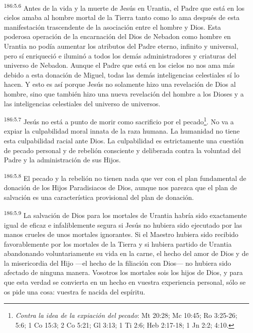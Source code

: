 \par 
\textsuperscript{186:5.6} Antes de la vida y la muerte de Jesús en Urantia, el Padre que está en los cielos amaba al hombre mortal de la Tierra tanto como lo ama después de esta manifestación trascendente de la asociación entre el hombre y Dios. Esta poderosa operación de la encarnación del Dios de Nebadon como hombre en Urantia no podía aumentar los atributos del Padre eterno, infinito y universal, pero sí enriqueció e iluminó a todos los demás administradores y criaturas del universo de Nebadon. Aunque el Padre que está en los cielos no nos ama más debido a esta donación de Miguel, todas las demás inteligencias celestiales sí lo hacen. Y esto es así porque Jesús no solamente hizo una revelación de Dios al hombre, sino que también hizo una nueva revelación del hombre a los Dioses y a las inteligencias celestiales del universo de universos.

\par 
\textsuperscript{186:5.7} Jesús no está a punto de morir como sacrificio por el pecado\footnote{\textit{Contra la idea de la expiación del pecado}: Mt 20:28; Mc 10:45; Ro 3:25-26; 5:6; 1 Co 15:3; 2 Co 5:21; Gl 3:13; 1 Ti 2:6; Heb 2:17-18; 1 Jn 2:2; 4:10.}. No va a expiar la culpabilidad moral innata de la raza humana. La humanidad no tiene esta culpabilidad racial ante Dios. La culpabilidad es estrictamente una cuestión de pecado personal y de rebelión consciente y deliberada contra la voluntad del Padre y la administración de sus Hijos.

\par 
\textsuperscript{186:5.8} El pecado y la rebelión no tienen nada que ver con el plan fundamental de donación de los Hijos Paradisiacos de Dios, aunque nos parezca que el plan de salvación es una característica provisional del plan de donación.

\par 
\textsuperscript{186:5.9} La salvación de Dios para los mortales de Urantia habría sido exactamente igual de eficaz e infaliblemente segura si Jesús no hubiera sido ejecutado por las manos crueles de unos mortales ignorantes. Si el Maestro hubiera sido recibido favorablemente por los mortales de la Tierra y si hubiera partido de Urantia abandonando voluntariamente su vida en la carne, el hecho del amor de Dios y de la misericordia del Hijo ---el hecho de la filiación con Dios--- no hubiera sido afectado de ninguna manera. Vosotros los mortales sois los hijos de Dios, y para que esta verdad se convierta en un hecho en vuestra experiencia personal, sólo se os pide una cosa: vuestra fe nacida del espíritu.
